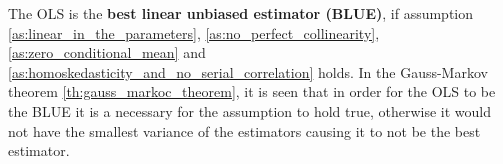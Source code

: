 


The OLS is the \textbf{best linear unbiased estimator (BLUE)}, if assumption  \ref{as:linear_in_the_parameters}, \ref{as:no_perfect_collinearity}, \ref{as:zero_conditional_mean} and \ref{as:homoskedasticity_and_no_serial_correlation} holds. In the Gauss-Markov theorem \ref{th:gauss_markoc_theorem}, it is seen that in order for the OLS to be the BLUE it is a necessary for the \homo assumption to hold true, otherwise it would not have the smallest variance of the estimators causing it to not be the best estimator.

